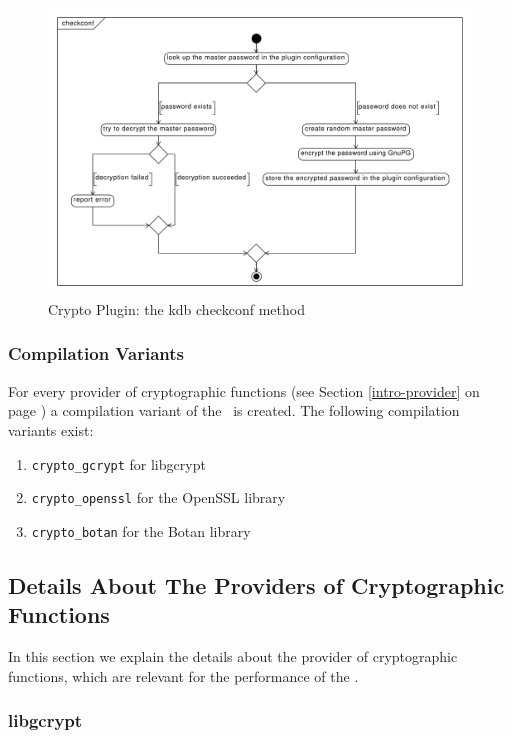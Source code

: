 \begin{figure}[h]
\center
\caption{Crypto Plugin: the kdb checkconf method}
\label{impl_checkconf}
\includegraphics[width=15.0cm]{umlet-figures/impl_checkconf.pdf}
\end{figure}

\subsubsection{Compilation Variants}

For every provider of cryptographic functions (see Section \ref{intro-provider} on page \pageref{intro-provider}) a compilation variant of the \crypto ~is created.
The following compilation variants exist:
\begin{enumerate}
	\item \texttt{crypto\_gcrypt} for libgcrypt
	\item \texttt{crypto\_openssl} for the OpenSSL library
	\item \texttt{crypto\_botan} for the Botan library
\end{enumerate}

\subsection{Details About The Providers of Cryptographic Functions}
\label{impl-crypto-details}

In this section we explain the details about the provider of cryptographic functions, which are relevant for the performance of the \crypto.

\subsubsection*{libgcrypt}


